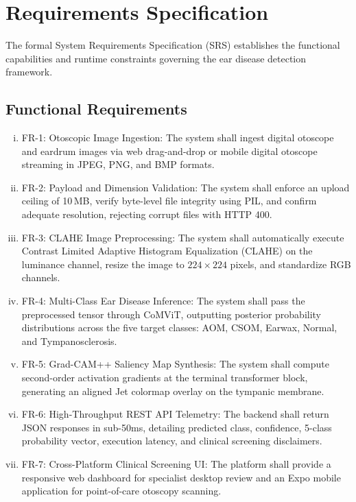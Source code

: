 \documentclass[12pt,a4paper]{report}
\renewcommand{\textbf}[1]{#1}
\begin{document}
\chapter{Requirements Specification}

The formal System Requirements Specification (SRS) establishes the functional capabilities and runtime constraints governing the ear disease detection framework.

\section{Functional Requirements}
\begin{enumerate}[(i)]
    \item \textbf{FR-1: Otoscopic Image Ingestion:} The system shall ingest digital otoscope and eardrum images via web drag-and-drop or mobile digital otoscope streaming in JPEG, PNG, and BMP formats.
    \item \textbf{FR-2: Payload and Dimension Validation:} The system shall enforce an upload ceiling of 10\,MB, verify byte-level file integrity using PIL, and confirm adequate resolution, rejecting corrupt files with HTTP 400.
    \item \textbf{FR-3: CLAHE Image Preprocessing:} The system shall automatically execute Contrast Limited Adaptive Histogram Equalization (CLAHE) on the luminance channel, resize the image to $224 \times 224$ pixels, and standardize RGB channels.
    \item \textbf{FR-4: Multi-Class Ear Disease Inference:} The system shall pass the preprocessed tensor through CoMViT, outputting posterior probability distributions across the five target classes: AOM, CSOM, Earwax, Normal, and Tympanosclerosis.
    \item \textbf{FR-5: Grad-CAM++ Saliency Map Synthesis:} The system shall compute second-order activation gradients at the terminal transformer block, generating an aligned Jet colormap overlay on the tympanic membrane.
    \item \textbf{FR-6: High-Throughput REST API Telemetry:} The backend shall return JSON responses in sub-50ms, detailing predicted class, confidence, 5-class probability vector, execution latency, and clinical screening disclaimers.
    \item \textbf{FR-7: Cross-Platform Clinical Screening UI:} The platform shall provide a responsive web dashboard for specialist desktop review and an Expo mobile application for point-of-care otoscopy scanning.
\end{enumerate}
\end{document}
